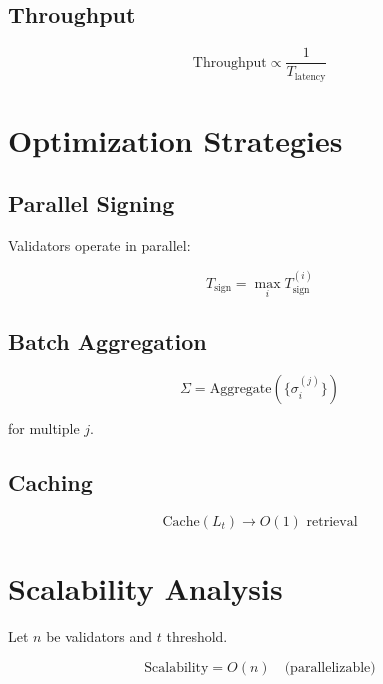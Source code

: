 \subsection{Throughput}

\begin{equation}
\text{Throughput} \propto \frac{1}{T_{\text{latency}}}
\end{equation}

\section{Optimization Strategies}

\subsection{Parallel Signing}

Validators operate in parallel:

\begin{equation}
T_{\text{sign}} = \max_i T_{\text{sign}}^{(i)}
\end{equation}

\subsection{Batch Aggregation}

\begin{equation}
\Sigma = \text{Aggregate}(\{\sigma_i^{(j)}\})
\end{equation}

for multiple $j$.

\subsection{Caching}

\begin{equation}
\text{Cache}(L_t) \rightarrow O(1) \text{ retrieval}
\end{equation}

\section{Scalability Analysis}

Let $n$ be validators and $t$ threshold.

\begin{equation}
\text{Scalability} = O(n) \quad \text{(parallelizable)}
\end{equation}

